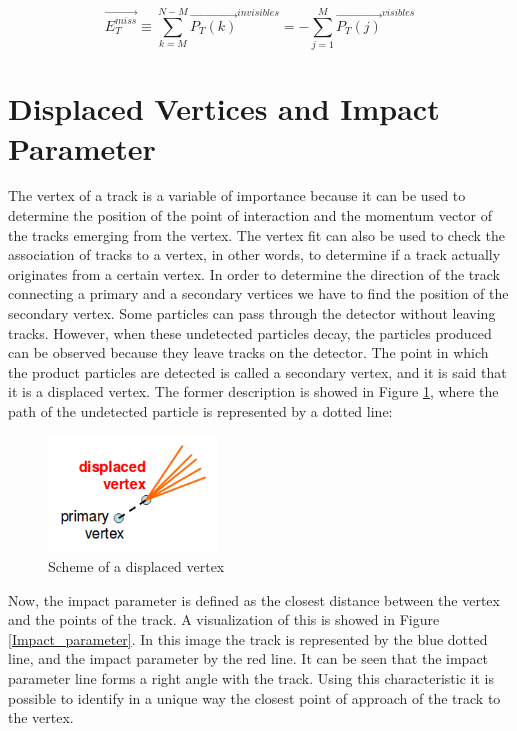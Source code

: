  \begin{equation}
  \vec{E_T^{miss}} \equiv \sum_{k=M}^{N-M}\vec{P_T(k)}^{invisibles} = - \sum_{j=1}^M  \vec{P_T(j)}^{visibles}
 \end{equation}

 
 \section{Displaced Vertices and Impact Parameter}
The vertex of a track is a variable of importance because it can be used to determine the position of the point of interaction and the momentum vector of the tracks emerging from the vertex. The 
vertex fit can also be used to check the association of tracks to a vertex, in other words, to determine if a track actually originates from a certain vertex. In order to determine the direction
of the track connecting a primary and a secondary vertices we have to find the position of the secondary vertex. Some particles can pass through the detector without leaving tracks. However,
when these undetected particles decay, the particles produced can be observed because they leave tracks on the detector. The point in which the product particles are detected is called a secondary 
vertex, and it is said that it is a displaced vertex. The former description is showed in Figure \ref{Displaced_vertex}, where the path of the undetected particle is represented by a dotted line:

 
 \begin{figure}[h] 
 \label{Displaced_vertex}
 \centering
 \caption{Scheme of a displaced vertex}
 \includegraphics[width=0.4\textwidth]{./Capitulos/VariableDefinitions/Displaced_vertex}  
 \end{figure}
 
Now, the impact parameter is defined as the closest distance between the vertex and the points of the track. A visualization of this is showed in Figure \ref{Impact_parameter}. In this image the track is represented by the blue dotted line, and the impact parameter by the red line. It can be seen that the impact parameter line forms a right angle with the track. Using this characteristic it is possible to identify in a unique way the closest point of approach of the track to the vertex.


